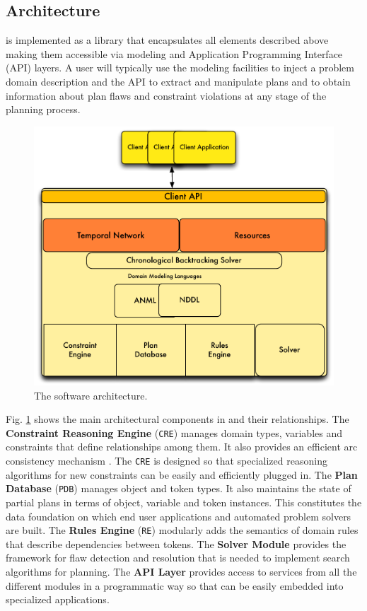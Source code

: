 \subsection{Architecture}
\label{sec:europa:arch}

\eu is implemented as a library that encapsulates all elements
described above making them accessible via modeling and Application
Programming Interface (API) layers.  A user will typically use the
modeling facilities to inject a problem domain description and the
API to extract and manipulate plans and to obtain information about
plan flaws and constraint violations at any stage of the planning
process.

\begin{figure}[b]
\centering
\includegraphics[scale=0.5]{figs/EUROPA-Architecture.pdf}
\caption{\small The \eu software architecture.}
\label{fig:europa-architecture}
\end{figure}

Fig. \ref{fig:europa-architecture} shows the main architectural
components in \eu and their relationships. The \textbf{Constraint
  Reasoning Engine} (\texttt{CRE}) manages domain types, variables and
constraints that define relationships among them. It also provides an
efficient arc consistency mechanism \cite{mackworth77}. The
\texttt{CRE} is designed so that specialized reasoning algorithms for
new constraints can be easily and efficiently plugged in. The
\textbf{Plan Database} (\texttt{PDB}) manages object and token
types. It also maintains the state of partial plans in terms of
object, variable and token instances. This constitutes the data
foundation on which end user applications and automated problem solvers
 are built. The \textbf{Rules Engine} (\texttt{RE})
modularly adds the semantics of domain rules that describe
dependencies between tokens. The \textbf{Solver Module} provides the
framework for flaw detection and resolution that is needed to
implement search algorithms for planning. The \textbf{API Layer}
provides access to services from all the different modules in a
programmatic way so that \eu can be easily embedded into specialized
applications.

